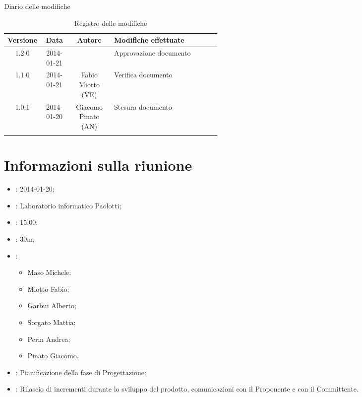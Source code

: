 
\newpage
Diario delle modifiche
\begin{center}
\begin{longtable}{|c|c|c|p{0.5\linewidth}|}
\toprule
\textbf{Versione} & \textbf{Data} & \textbf{Autore} & \textbf{Modifiche effettuate}\\

\midrule
1.2.0 & 2014-01-21 &  & Approvazione documento\\
\midrule
1.1.0 & 2014-01-21 & Fabio Miotto (VE) & Verifica documento\\
\midrule
1.0.1 & 2014-01-20 & Giacomo Pinato (AN) & Stesura documento\\

\bottomrule
\caption{Registro delle modifiche}
\label{tab:changelog}
\end{longtable}
\end{center}

\newpage
\tableofcontents


\newpage
\section{Informazioni sulla riunione}%
\label{1.0}
\begin{itemize}
\item {}: 2014-01-20;
\item {}: Laboratorio informatico Paolotti;
\item {}: 15:00;
\item {}: 30m;
\item {}: \NomeGruppo{}
\begin{itemize}
\item Maso Michele;
\item Miotto Fabio;
\item Garbui Alberto;
\item Sorgato Mattia;
\item Perin Andrea;
\item Pinato Giacomo.
\end{itemize}
\item {}: Pianificazione della fase di Progettazione;
\item {}: Rilascio di incrementi durante lo sviluppo del prodotto, comunicazioni con il Proponente e con il Committente.
\end{itemize}

